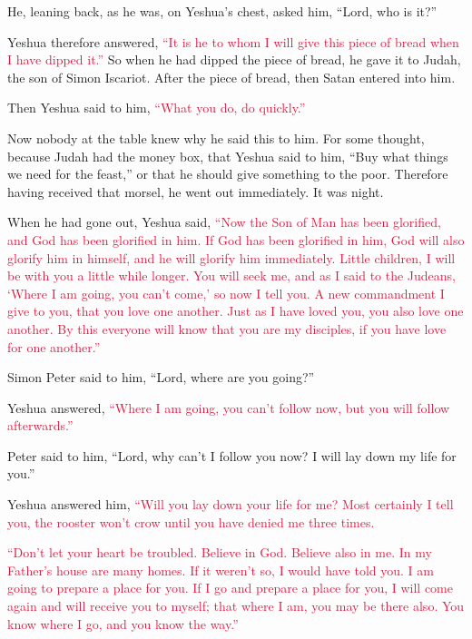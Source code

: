\myverse{}He, leaning back, as he was, on Yeshua’s chest, asked him, “Lord,
who is it?”

\myverse{}Yeshua therefore answered,
\textcolor{crimson}{“It is he to whom I will give this piece of bread when I have dipped it.”} So when he had dipped
the piece of bread, he gave it to Judah, the son of Simon Iscariot.
\myverse{}After the piece of bread, then Satan entered into him.

Then Yeshua said to him,
\textcolor{crimson}{“What you do, do quickly.”}

\myverse{}Now nobody at the table knew why he said this to him.
\myverse{}For some thought, because Judah had the money box, that Yeshua said to him,
“Buy what things we need for the feast,” or that he should give something to the poor.
\myverse{}Therefore having received that morsel, he went out immediately. It was night.

\myverse{}When he had gone out, Yeshua said,
\textcolor{crimson}{“Now the Son of Man has been glorified, and God has been glorified in him.
}
\myverse{}\textcolor{crimson}{If God has been glorified in him, God will also glorify him in himself,
	and he will glorify him immediately.
}
\myverse{}\textcolor{crimson}{Little children, I will be with you a little while longer. You will seek
	me, and as I said to the Judeans, ‘Where I am going, you can’t come,’ so now I tell you.
}
\myverse{}\textcolor{crimson}{A new commandment I give to you, that you love one another. Just as I
	have loved you, you also love one another.
}
\myverse{}\textcolor{crimson}{By this everyone will know that you are my disciples, if you have love
	for one another.”}

\myverse{}Simon Peter said to him, “Lord, where are you going?”

Yeshua answered,
\textcolor{crimson}{“Where I am going, you can’t follow now, but you will follow afterwards.”}

\myverse{}Peter said to him, “Lord, why can’t I follow you now? I will
lay down my life for you.”

\myverse{}Yeshua answered him,
\textcolor{crimson}{“Will you lay down your life for me? Most certainly I tell you, the rooster won’t crow until you have
	denied me three times.}


\mychapter{} \myverse*{}\textcolor{crimson}{“Don’t let your heart be troubled. Believe in God. Believe
	also in me.
}
\myverse{}\textcolor{crimson}{In my Father’s house are many homes. If it weren’t so, I would have told
	you. I am going to prepare a place for you.
}
\myverse{}\textcolor{crimson}{If I go and prepare a place for you, I will come again and will receive
	you to myself; that where I am, you may be there also.
}
\myverse{}\textcolor{crimson}{You know where I go, and you know the way.”}

